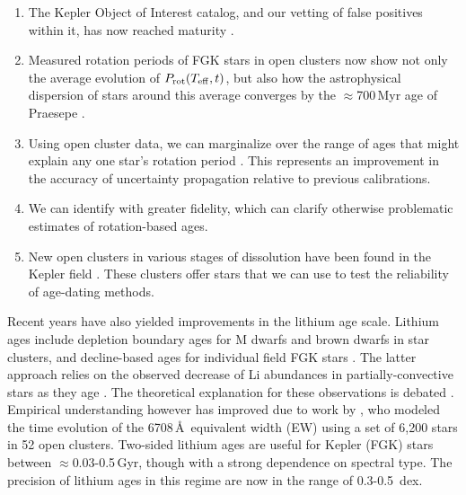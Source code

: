 \documentclass[11pt,twocolumn,tighten]{aastex63}
\begin{document}
\begin{enumerate}[label={\it \roman*)},leftmargin=12pt,topsep=0pt,itemsep=-1ex,partopsep=1ex,parsep=1ex]
  \item The Kepler Object of Interest catalog, and our vetting of
    false positives within it, has now reached maturity
    \citep[e.g.][]{Thompson_2018}.
  \item Measured rotation periods of FGK stars in open clusters now
    show not only the average evolution of $P_{\rm rot}(T_{\rm
    eff},t)$, but also how the astrophysical dispersion of stars
    around this average converges by the $\approx$700\,Myr age of
    Praesepe
    \citep[e.g.][]{Curtis_2019_ngc6811,Gillen_2020,Rampalli_2021,Fritzewski_2021,Rebull_2022,Dungee_2022,2023AJ....166...14B}.
  \item Using open cluster data, we can marginalize over the range of
    ages that might explain any one star's rotation period
    \citep{Bouma_2023}.  This represents an improvement in the
    accuracy of uncertainty propagation relative to previous
    calibrations.
  \item We can identify  with greater fidelity, which can clarify otherwise problematic estimates of
    rotation-based ages.
  \item New open clusters in various stages of dissolution have been
    found in the Kepler field
    \cite[e.g.][]{2019AJ....158..122K,Kerr_2021,Barber_2022}.
    These clusters offer stars that we can use to test
    the reliability of  age-dating methods.
\end{enumerate}

Recent years have also yielded improvements in the
lithium age scale.  Lithium ages include depletion boundary ages for M
dwarfs and brown dwarfs in star clusters, and decline-based ages for
individual field FGK stars \citep{Soderblom_2010}.  The latter
approach relies on the observed decrease of Li abundances in
partially-convective stars as they age
\citep[e.g.][]{2005A&A...442..615S}.  The theoretical explanation for
these observations is debated
\citep[e.g.][]{1995ApJ...441..865C,2010ApJ...716.1269D,2019MNRAS.485.4052C}.
Empirical understanding however has improved due to work by
\citet{Jeffries_2023}, who modeled the time evolution of the
 6708\,\AA\ equivalent width (EW) using a set of 6{,}200
stars in 52 open clusters.  Two-sided lithium ages are useful for
Kepler (FGK) stars between $\approx$0.03-0.5\,Gyr, though with a
strong dependence on spectral type.  The precision of lithium ages in
this regime are now in the range of 0.3-0.5~dex.
\end{document}

